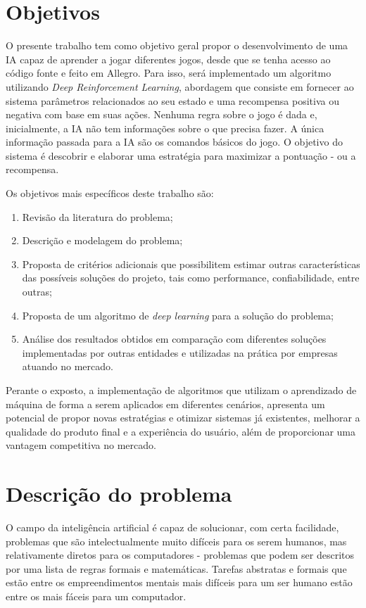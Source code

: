 \section{Objetivos}
 O presente trabalho tem como objetivo geral propor o desenvolvimento de uma IA capaz de aprender a jogar diferentes jogos, desde que se tenha acesso ao código fonte e feito em Allegro. Para isso, será implementado um algoritmo utilizando \textit{Deep Reinforcement Learning}, abordagem que consiste em fornecer ao sistema parâmetros relacionados ao seu estado e uma recompensa positiva ou negativa com base em suas ações. 
 Nenhuma regra sobre o jogo é dada e, inicialmente, a IA não tem informações sobre o que precisa fazer. A única informação passada para a IA são os comandos básicos do jogo. 
 O objetivo do sistema é descobrir e elaborar uma estratégia para maximizar a pontuação - ou a recompensa.

 Os objetivos mais específicos deste trabalho são:
 \begin{enumerate}
 	\item Revisão da literatura do problema;
 	\item Descrição e modelagem do problema;
 	\item Proposta de critérios adicionais que possibilitem estimar outras características das possíveis soluções do projeto, tais como performance, confiabilidade, entre outras;
 	\item Proposta de um algoritmo de \textit{deep learning} para a solução do problema;
 	\item Análise dos resultados obtidos em comparação com diferentes soluções implementadas por outras entidades e utilizadas na prática por empresas atuando no mercado.
 \end{enumerate}

 Perante o exposto, a implementação de algoritmos que utilizam o aprendizado de máquina de forma a serem aplicados em diferentes cenários,
 apresenta um potencial de propor novas estratégias e otimizar sistemas já existentes, melhorar a qualidade do produto final e a experiência do usuário, além de proporcionar uma vantagem competitiva no mercado.

\section{Descrição do problema}
\label{sec:descricao_do_problema}
O campo da inteligência artificial é capaz de solucionar, com certa facilidade, problemas que são intelectualmente muito difíceis para os serem humanos, mas relativamente diretos para os computadores - problemas que podem ser descritos por uma lista de regras formais e matemáticas. Tarefas abstratas e formais que estão entre os empreendimentos mentais mais difíceis para um ser humano estão entre os mais fáceis para um computador.

